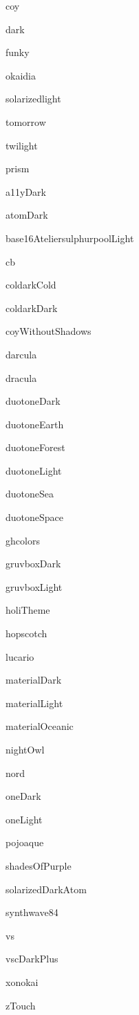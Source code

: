 \begin{DoxyItemize}
\item coy
\item dark
\item funky
\item okaidia
\item solarizedlight
\item tomorrow
\item twilight
\item prism
\item a11y\+Dark
\item atom\+Dark
\item base16\+Ateliersulphurpool\+Light
\item cb
\item coldark\+Cold
\item coldark\+Dark
\item coy\+Without\+Shadows
\item darcula
\item dracula
\item duotone\+Dark
\item duotone\+Earth
\item duotone\+Forest
\item duotone\+Light
\item duotone\+Sea
\item duotone\+Space
\item ghcolors
\item gruvbox\+Dark
\item gruvbox\+Light
\item holi\+Theme
\item hopscotch
\item lucario
\item material\+Dark
\item material\+Light
\item material\+Oceanic
\item night\+Owl
\item nord
\item one\+Dark
\item one\+Light
\item pojoaque
\item shades\+Of\+Purple
\item solarized\+Dark\+Atom
\item synthwave84
\item vs
\item vsc\+Dark\+Plus
\item xonokai
\item z\+Touch 
\end{DoxyItemize}